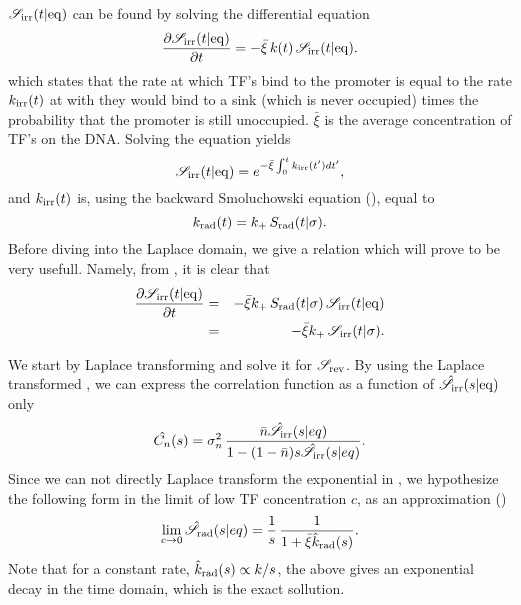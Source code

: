 $\mathscr{S}_{\rm irr}(t|{\rm eq})$ can be found by solving the differential equation
\begin{equation}
 \pdiff{\mathscr{S}_{\rm irr}(t|{\rm eq})}{t} = - \bar{\xi} \, k(t) \, \mathscr{S}_{\rm irr}(t|{\rm eq}).
 \elabel{DE_Seq}
\end{equation}
which states that the rate at which TF's bind to the promoter is equal to the rate $k_{{\rm irr}}(t)$ at with they would bind to a sink (which is never occupied) times the probability that the promoter is still unoccupied. $\bar{\xi}$ is the average concentration of TF's on the DNA. Solving the equation yields
\begin{equation}
 \mathscr{S}_{\rm irr}(t|{\rm eq}) = e^{-\bar{\xi}\int_0^t k_{{\rm irr}}(t') dt'},
 \elabel{Seq}
\end{equation}
and $k_{{\rm irr}}(t)$ is, using the backward Smoluchowski equation (), equal to 
\begin{equation}
 k_{\rm rad}(t) = k_+ \, S_{\rm rad}(t|\sigma).
 \elabel{krad}
\end{equation}
Before diving into the Laplace domain, we give a relation which will prove to be very usefull. Namely, from , it is clear that
\begin{eqnarray}
 \pdiff{\mathscr{S}_{\rm irr}(t|{\rm eq})}{t} & = & -\bar{\xi} k_+ \, S_{\rm rad}(t|\sigma) \, \mathscr{S}_{\rm irr}(t|{\rm eq}) \\
 & = & -\bar{\xi} k_+ \, \mathscr{S}_{\rm irr}(t|\sigma).
 \elabel{SeqSsi}
\end{eqnarray}

We start by Laplace transforming  and solve it for $\mathscr{S}_{\rm rev}$. By using the Laplace transformed , we can express the correlation function as a function of $\hat{\mathscr{S}}_{\rm irr}(s|{\rm eq})$ only
\begin{equation}
 \hat{C_n}(s) = \sigma_n^2 \, \frac{\bar{n} \hat{\mathscr{S}}_{\rm irr}(s|eq)}{1-(1-\bar{n})s\hat{\mathscr{S}}_{\rm irr}(s|eq)}.
 \elabel{LapCorr}
\end{equation}
Since we can not directly Laplace transform the exponential in , we hypothesize the following form in the limit of low TF concentration $c$, as an approximation ()
\begin{equation}
 \lim_{c\to0} \hat{\mathscr{S}}_{\rm rad}(s|eq) = \frac{1}{s}  \, \frac{1}{ 1 + \bar{\xi} \hat{k}_{\rm rad}(s)}.
 \elabel{Seq_approx}
\end{equation}
Note that for a constant rate, $\hat{k}_{\rm rad}(s) \propto k/s$, the above gives an exponential decay in the time domain, which is the exact sollution. 

